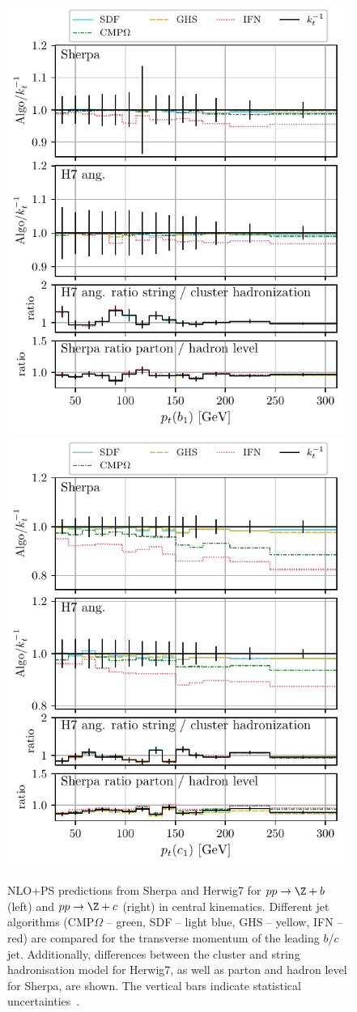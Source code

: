\documentclass[10pt,a4paper]{book}
\begin{document}
\begin{figure}
    \centering
    \includegraphics[width=0.5\linewidth,page=3]{ftag/summary/ppzj_bottom_nlops_comparisons.pdf}%
    \includegraphics[width=0.5\linewidth,page=3]{ftag/summary/ppzj_charm_nlops_comparisons.pdf}
    \caption{NLO+PS predictions from Sherpa and Herwig7 for $pp \to \Z + b$ (left) and $pp \to \Z + c$ (right) in central kinematics. Different jet algorithms (CMP$\Omega$ -- green, SDF -- light blue, GHS -- yellow, IFN -- red) are compared for the transverse momentum of the leading $b$/$c$ jet. Additionally, differences between the cluster and string hadronisation model for Herwig7, as well as parton and hadron level for Sherpa, are shown. The vertical bars indicate statistical uncertainties~\cite{Behring:2025ilo}.}
    \label{fig:summary_ppzj_nlops_bottom}
\end{figure}
\end{document}
